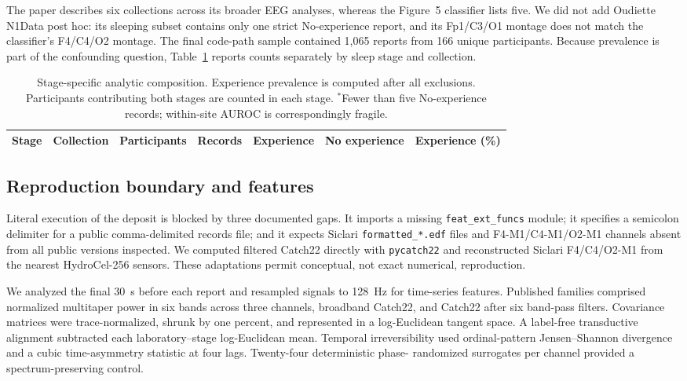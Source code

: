 \documentclass[10pt,twocolumn]{article}
\newcommand{\code}[1]{\texttt{#1}}
\begin{document}
The paper describes six collections across its broader EEG analyses, whereas
the Figure~5 classifier lists five. We did not add Oudiette N1Data post hoc:
its sleeping subset contains only one strict No-experience report, and its
Fp1/C3/O1 montage does not match the classifier's F4/C4/O2 montage. The final
code-path sample contained 1,065 reports from 166 unique participants. Because
prevalence is part of the confounding question, Table~\ref{tab:composition}
reports counts separately by sleep stage and collection.

\begin{table}[t]
\centering
\caption{Stage-specific analytic composition. Experience prevalence is
computed after all exclusions. Participants contributing both stages are
counted in each stage. $^{*}$Fewer than five No-experience records; within-site
AUROC is correspondingly fragile.}
\label{tab:composition}
\small
\begin{tabular}{llrrrrr}
\toprule
Stage & Collection & Participants & Records & Experience & No experience & Experience (\%) \\
\midrule

\end{tabular}
\end{table}

\subsection{Reproduction boundary and features}

Literal execution of the deposit is blocked by three documented gaps. It
imports a missing \code{feat\_ext\_funcs} module; it specifies a semicolon
delimiter for a public comma-delimited records file; and it expects Siclari
\code{formatted\_*.edf} files and F4-M1/C4-M1/O2-M1 channels absent from all
public versions inspected. We computed filtered Catch22 directly with
\code{pycatch22} and reconstructed Siclari F4/C4/O2-M1 from the nearest
HydroCel-256 sensors. These adaptations permit conceptual, not exact numerical,
reproduction.

We analyzed the final 30~s before each report and resampled signals to 128~Hz
for time-series features. Published families comprised normalized multitaper
power in six bands across three channels, broadband Catch22, and Catch22 after
six band-pass filters. Covariance matrices were trace-normalized, shrunk by one
percent, and represented in a log-Euclidean tangent space. A label-free
transductive alignment subtracted each laboratory--stage log-Euclidean mean.
Temporal irreversibility used ordinal-pattern Jensen--Shannon divergence and a
cubic time-asymmetry statistic at four lags. Twenty-four deterministic phase-
randomized surrogates per channel provided a spectrum-preserving control.
\end{document}
